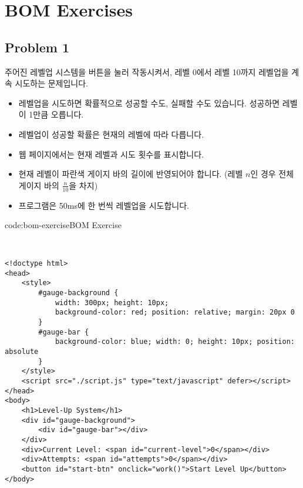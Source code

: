 \section{BOM Exercises} \label{sect:bom-exercises}

\subsection*{Problem 1}

주어진 레벨업 시스템을 버튼을 눌러 작동시켜서, 레벨 0에서 레벨 10까지 레벨업을 계속 시도하는 문제입니다.

\begin{itemize}
    \item 레벨업을 시도하면 확률적으로 성공할 수도, 실패할 수도 있습니다. 성공하면 레벨이 1만큼 오릅니다.
    \item 레벨업이 성공할 확률은 현재의 레벨에 따라 다릅니다.
    \item 웹 페이지에서는 현재 레벨과 시도 횟수를 표시합니다.
    \item 현재 레벨이 파란색 게이지 바의 길이에 반영되어야 합니다. (레벨 $n$인 경우 전체 게이지 바의 $\frac n {10}$을 차지)
    \item 프로그램은 50ms에 한 번씩 레벨업을 시도합니다.
\end{itemize}

\begin{codeenv}{code:bom-exercise}{BOM Exercise}\begin{verbatim}


<!doctype html>
<head>
    <style>
        #gauge-background {
            width: 300px; height: 10px;
            background-color: red; position: relative; margin: 20px 0
        }
        #gauge-bar {
            background-color: blue; width: 0; height: 10px; position: absolute
        }
    </style>
    <script src="./script.js" type="text/javascript" defer></script>
</head>
<body>
    <h1>Level-Up System</h1>
    <div id="gauge-background">
        <div id="gauge-bar"></div>
    </div>
    <div>Current Level: <span id="current-level">0</span></div>
    <div>Attempts: <span id="attempts">0</span></div>
    <button id="start-btn" onclick="work()">Start Level Up</button>
</body>
\end{verbatim}
\end{codeenv}

